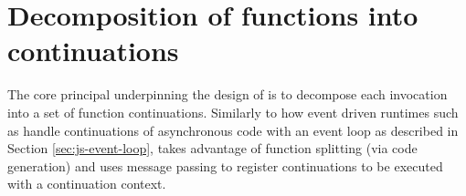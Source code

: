 \section{Decomposition of \faas{} functions into continuations}
The core principal underpinning the design of \faaas{} is to decompose each \faas{} invocation into a set of function continuations. Similarly to how event driven runtimes such as \js{} handle continuations of asynchronous code with an event loop as described in Section \ref{sec:js-event-loop}, \faaas{} takes advantage of function splitting (via code generation) and uses message passing to register continuations to be executed with a continuation context.
